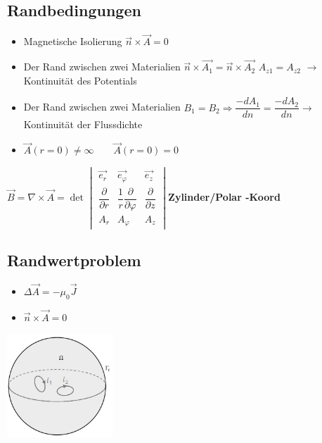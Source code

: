 \subsection{Randbedingungen}
\begin{itemize}
	\item Magnetische Isolierung $\vec{n} \times \vec{A} =0$
	\item Der Rand zwischen zwei Materialien $\vec{n} \times \vec{A_{1}}=\vec{n} \times \vec{A_{2}}$ \quad $A_{z1} = A_{z2}$ \qquad$\rightarrow$ Kontinuität des Potentials
	\item Der Rand zwischen zwei Materialien $B_{1}=B_{2} \Rightarrow \dfrac{-dA_{1}}{d n}=\dfrac{-dA_{2}}{d n} $\qquad $\rightarrow$ Kontinuität der Flussdichte
    \item $\vec{A}(r=0) \neq \infty \qquad \vec{A}(r=0)=0 $
\end{itemize}
$\boxed{\vec B=\nabla\times\vec{A} = 
    \det
    \begin{vmatrix}
    \vec{e_r} & \vec{e_{\varphi}}&\vec{e_z}\\
    \dfrac{\partial}{\partial r} & \dfrac{1}{r}\dfrac{\partial}{\partial \varphi}& \dfrac{\partial}{\partial z}\\
    A_r& A_{\varphi} & A_z
    \end{vmatrix}}$\textbf{Zylinder/Polar -Koord }
\subsection{Randwertproblem}
\begin{minipage}{8cm}
	\begin{itemize}
		\item $\Delta\vec{A}=-\mu_{0}\vec{J}$
		\item $\vec{n} \times \vec{A} =0$
	\end{itemize}	
\end{minipage}
\begin{minipage}{8cm}
	\includegraphics[width=4cm]{images/Randwertproblem.jpg}
\end{minipage}
